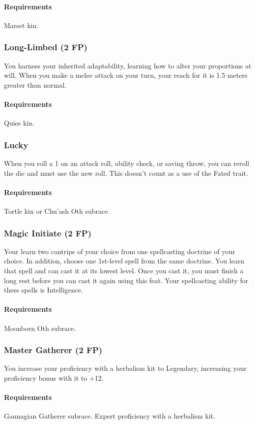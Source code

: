     \paragraph{Requirements} Marset kin.
\subsubsection{Long-Limbed (2 FP)} \label{feat::longlimbed}
    You harness your inherited adaptability, learning how to alter your proportions at will.
    When you make a melee attack on your turn, your reach for it is 1.5 meters greater than normal.
    \paragraph{Requirements} Quies kin.
\subsubsection{Lucky} \label{feat::lucky}
    When you roll a 1 on an attack roll, ability check, or saving throw, you can reroll the die and must use the new roll.
    This doesn't count as a use of the Fated trait.
    \paragraph{Requirements} Tortle kin or Chu'ash Oth subrace.
\subsubsection{Magic Initiate (2 FP)} \label{feat::magicinitiate}
    Your learn two cantrips of your choice from one spellcasting doctrine of your choice.
    In addition, choose one 1st-level spell from the same doctrine.
    You learn that spell and can cast it at its lowest level.
    Once you cast it, you must finish a long rest before you can cast it again using this feat.
    Your spellcasting ability for these spells is Intelligence.
    \paragraph{Requirements} Moonborn Oth subrace.
\subsubsection{Master Gatherer (2 FP)} \label{feat::mastergatherer}
    You increase your proficiency with a herbalism kit to Legendary, increasing your proficiency bonus with it to +12.
    \paragraph{Requirements} Gannagian Gatherer subrace. Expert proficiency with a herbalism kit.
